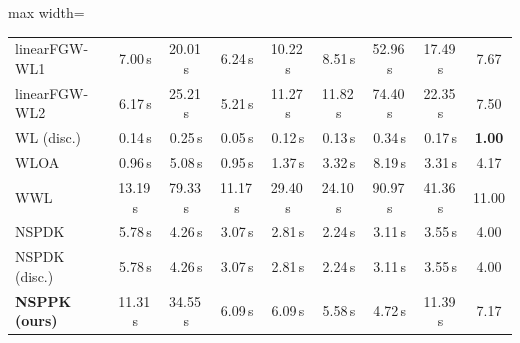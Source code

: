 \begin{table}[H]
\begin{adjustbox}{max width=\textwidth}
\begin{tabular}{lcccccccc}
linearFGW-WL1 & 7.00\,s & 20.01\,s & 6.24\,s & 10.22\,s & 8.51\,s & 52.96\,s & 17.49\,s & 7.67\\
linearFGW-WL2 & 6.17\,s & 25.21\,s & 5.21\,s & 11.27\,s & 11.82\,s & 74.40\,s & 22.35\,s & 7.50\\
WL (disc.) & 0.14\,s & 0.25\,s & 0.05\,s & 0.12\,s & 0.13\,s & 0.34\,s & 0.17\,s & \textbf{1.00}\\
WLOA & 0.96\,s & 5.08\,s & 0.95\,s & 1.37\,s & 3.32\,s & 8.19\,s & 3.31\,s & 4.17\\
WWL & 13.19\,s & 79.33\,s & 11.17\,s & 29.40\,s & 24.10\,s & 90.97\,s & 41.36\,s & 11.00\\
NSPDK & 5.78\,s & 4.26\,s & 3.07\,s & 2.81\,s & 2.24\,s & 3.11\,s & 3.55\,s & 4.00\\
NSPDK (disc.) & 5.78\,s & 4.26\,s & 3.07\,s & 2.81\,s & 2.24\,s & 3.11\,s & 3.55\,s & 4.00\\
\rowcolor{gray!10}
\textbf{NSPPK (ours)} & 11.31\,s & 34.55\,s & 6.09\,s & 6.09\,s & 5.58\,s & 4.72\,s & 11.39\,s & 7.17\\
\bottomrule
\end{tabular}
\end{adjustbox}
\end{table}

